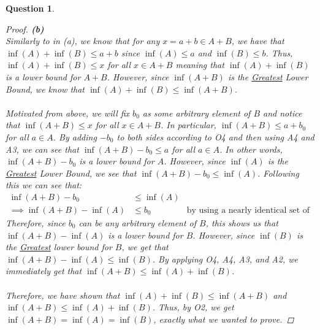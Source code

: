 \documentclass[10pt,a4paper]{article}
\newtheorem*{question*}{Question}
\theoremstyle{definition}
\begin{document}
\begin{question*}{$ $}
\begin{proof}{\textbf{(b)}}
\\Similarly to in (a), we know that for any $x = a + b \in A+B$, we have that $\inf(A) + \inf(B) \leq a + b$ since $\inf(A) \leq a$ and $\inf(B) \leq b$. Thus, $\inf(A) + \inf(B) \leq x$ for all $x \in A+B$ meaning that $\inf(A) + \inf(B)$ is a lower bound for $A+B$. However, since $\inf(A+B)$ is the \underline{Greatest} Lower Bound, we know that $\inf(A) + \inf(B) \leq \inf(A+B)$.
\\
\\Motivated from above, we will fix $b_0$ as some arbitrary element of $B$ and notice that $\inf(A+B) \leq x$ for all $x \in A+B$. In particular, $\inf(A+B) \leq a + b_0$ for all $a \in A$. By adding $-b_0$ to both sides according to O4 and then using A4 and A3, we can see that $\inf(A+B) - b_0 \leq a$ for all $a \in A$. In other words, $\inf(A+B) - b_0$ is a lower bound for $A$. However, since $\inf(A)$ is the \underline{Greatest} Lower Bound, we see that $\inf(A+B) - b_0 \leq \inf(A)$. Following this we can see that:
\begin{align*}
\inf(A+B) - b_0 &\leq \inf(A)\\
\implies \inf(A+B) - \inf(A) &\leq b_0 &\text{by using a nearly identical set of steps used in part (a)}
\end{align*}
Therefore, since $b_0$ can be any arbitrary element of $B$, this shows us that $\inf(A+B) - \inf(A)$ is a lower bound for $B$. However, since $\inf(B)$ is the \underline{Greatest} lower bound for $B$, we get that $\inf(A+B) - \inf(A) \leq \inf(B)$. By applying O4, A4, A3, and A2, we immediately get that $\inf(A+B) \leq \inf(A) + \inf(B)$.
\\
\\Therefore, we have shown that $\inf(A) + \inf(B) \leq \inf(A+B)$ and $\inf(A+B) \leq \inf(A) + \inf(B)$. Thus, by O2, we get $\inf(A+B) = \inf(A) = \inf(B)$, exactly what we wanted to prove. 
\end{proof}

\end{question*}
\end{document}
